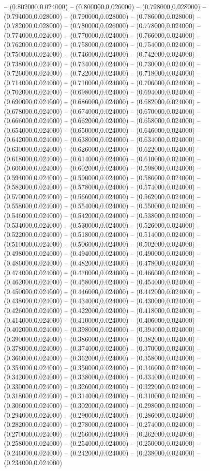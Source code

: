 -- (0.802000,0.024000) -- (0.800000,0.026000) -- (0.798000,0.028000) -- (0.794000,0.028000) -- (0.790000,0.028000) -- (0.786000,0.028000) -- (0.782000,0.028000) -- (0.780000,0.026000) -- (0.778000,0.024000) -- (0.774000,0.024000) -- (0.770000,0.024000) -- (0.766000,0.024000) -- (0.762000,0.024000) -- (0.758000,0.024000) -- (0.754000,0.024000) -- (0.750000,0.024000) -- (0.746000,0.024000) -- (0.742000,0.024000) -- (0.738000,0.024000) -- (0.734000,0.024000) -- (0.730000,0.024000) -- (0.726000,0.024000) -- (0.722000,0.024000) -- (0.718000,0.024000) -- (0.714000,0.024000) -- (0.710000,0.024000) -- (0.706000,0.024000) -- (0.702000,0.024000) -- (0.698000,0.024000) -- (0.694000,0.024000) -- (0.690000,0.024000) -- (0.686000,0.024000) -- (0.682000,0.024000) -- (0.678000,0.024000) -- (0.674000,0.024000) -- (0.670000,0.024000) -- (0.666000,0.024000) -- (0.662000,0.024000) -- (0.658000,0.024000) -- (0.654000,0.024000) -- (0.650000,0.024000) -- (0.646000,0.024000) -- (0.642000,0.024000) -- (0.638000,0.024000) -- (0.634000,0.024000) -- (0.630000,0.024000) -- (0.626000,0.024000) -- (0.622000,0.024000) -- (0.618000,0.024000) -- (0.614000,0.024000) -- (0.610000,0.024000) -- (0.606000,0.024000) -- (0.602000,0.024000) -- (0.598000,0.024000) -- (0.594000,0.024000) -- (0.590000,0.024000) -- (0.586000,0.024000) -- (0.582000,0.024000) -- (0.578000,0.024000) -- (0.574000,0.024000) -- (0.570000,0.024000) -- (0.566000,0.024000) -- (0.562000,0.024000) -- (0.558000,0.024000) -- (0.554000,0.024000) -- (0.550000,0.024000) -- (0.546000,0.024000) -- (0.542000,0.024000) -- (0.538000,0.024000) -- (0.534000,0.024000) -- (0.530000,0.024000) -- (0.526000,0.024000) -- (0.522000,0.024000) -- (0.518000,0.024000) -- (0.514000,0.024000) -- (0.510000,0.024000) -- (0.506000,0.024000) -- (0.502000,0.024000) -- (0.498000,0.024000) -- (0.494000,0.024000) -- (0.490000,0.024000) -- (0.486000,0.024000) -- (0.482000,0.024000) -- (0.478000,0.024000) -- (0.474000,0.024000) -- (0.470000,0.024000) -- (0.466000,0.024000) -- (0.462000,0.024000) -- (0.458000,0.024000) -- (0.454000,0.024000) -- (0.450000,0.024000) -- (0.446000,0.024000) -- (0.442000,0.024000) -- (0.438000,0.024000) -- (0.434000,0.024000) -- (0.430000,0.024000) -- (0.426000,0.024000) -- (0.422000,0.024000) -- (0.418000,0.024000) -- (0.414000,0.024000) -- (0.410000,0.024000) -- (0.406000,0.024000) -- (0.402000,0.024000) -- (0.398000,0.024000) -- (0.394000,0.024000) -- (0.390000,0.024000) -- (0.386000,0.024000) -- (0.382000,0.024000) -- (0.378000,0.024000) -- (0.374000,0.024000) -- (0.370000,0.024000) -- (0.366000,0.024000) -- (0.362000,0.024000) -- (0.358000,0.024000) -- (0.354000,0.024000) -- (0.350000,0.024000) -- (0.346000,0.024000) -- (0.342000,0.024000) -- (0.338000,0.024000) -- (0.334000,0.024000) -- (0.330000,0.024000) -- (0.326000,0.024000) -- (0.322000,0.024000) -- (0.318000,0.024000) -- (0.314000,0.024000) -- (0.310000,0.024000) -- (0.306000,0.024000) -- (0.302000,0.024000) -- (0.298000,0.024000) -- (0.294000,0.024000) -- (0.290000,0.024000) -- (0.286000,0.024000) -- (0.282000,0.024000) -- (0.278000,0.024000) -- (0.274000,0.024000) -- (0.270000,0.024000) -- (0.266000,0.024000) -- (0.262000,0.024000) -- (0.258000,0.024000) -- (0.254000,0.024000) -- (0.250000,0.024000) -- (0.246000,0.024000) -- (0.242000,0.024000) -- (0.238000,0.024000) -- (0.234000,0.024000) 